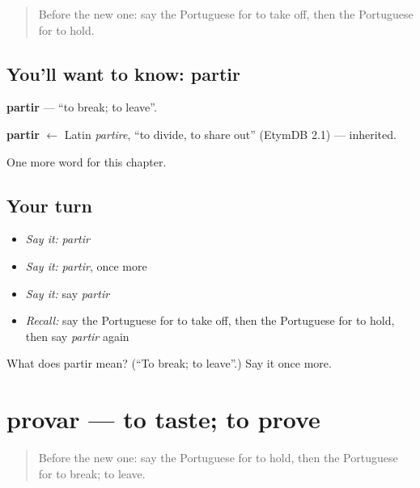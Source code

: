 \label{lesson:PT-C172-partir}



\begin{quote}
Before the new one: say the Portuguese for to take off, then the Portuguese for to hold.
\end{quote}

\subsection*{You'll want to know: partir}
\textbf{partir} — \textquotedblleft{}to break; to leave\textquotedblright{}.

\begin{cousinweb}
\textbf{partir} $\leftarrow$ Latin \emph{partire}, \textquotedblleft{}to divide, to share out\textquotedblright{} (EtymDB 2.1) — inherited.
\end{cousinweb}

\begin{grammarlens}[title={What you've built}]
One more word for this chapter.
\end{grammarlens}

\subsection*{Your turn}
\begin{itemize}
\raggedright
  \item \emph{Say it:} \emph{partir}
  \item \emph{Say it:} \emph{partir}, once more
  \item \emph{Say it:} say \emph{partir}
  \item \emph{Recall:} say the Portuguese for to take off, then the Portuguese for to hold, then say \emph{partir} again
\end{itemize}

\begin{tcolorbox}[breakable,colback=teal!4,colframe=teal!35!black,title={Before you move on}]
What does partir mean? (\textquotedblleft{}To break; to leave\textquotedblright{}.) Say it once more.
\end{tcolorbox}
\section[provar]{provar — to taste; to prove}

\label{lesson:PT-C172-provar}



\begin{quote}
Before the new one: say the Portuguese for to hold, then the Portuguese for to break; to leave.
\end{quote}

